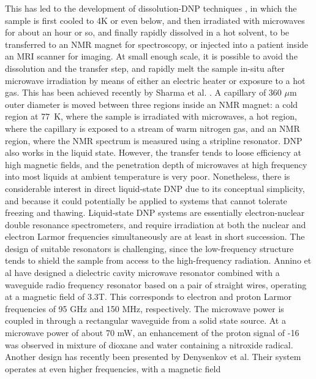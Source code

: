 This has led to the development of dissolution-DNP techniques
\cite{ArdenkjaerLarsen:2016jq}, in which the sample is first cooled to 4K
or even below, and then irradiated with microwaves for about an hour or
so, and finally rapidly dissolved in a hot solvent, to be transferred to
an NMR magnet for spectroscopy, or injected into a patient inside an MRI
scanner for imaging. At small enough scale, it is possible to avoid the
dissolution and the transfer step, and rapidly melt the sample in-situ
after microwave irradiation by means of either an electric heater or
exposure to a hot gas. This has been achieved recently by Sharma et al.
\cite{Sharma:2015ce}. A capillary of 360 $\mu$m outer diameter is moved
between three regions inside an NMR magnet: a cold region at 77~K, where
the sample is irradiated with microwaves, a hot region, where the
capillary is exposed to a stream of warm nitrogen gas, and an NMR
region, where the NMR spectrum is measured using a stripline resonator.
DNP also works in the liquid state. However, the transfer tends to loose
efficiency at high magnetic fields, and the penetration depth of
microwaves at high frequency into most liquids at ambient temperature is
very poor. Nonetheless, there is considerable interest in direct
liquid-state DNP \cite{Loening:2002wg,Lingwood:2009jy,Griffin:2010cu} due
to its conceptual simplicity, and because it could potentially be
applied to systems that cannot tolerate freezing and thawing.
Liquid-state DNP systems are essentially electron-nuclear double
resonance spectrometers, and require irradiation at both the nuclear and
electron Larmor frequencies simultaneously are at least in short
succession. The design of suitable resonators is challenging, since the
low-frequency structure tends to shield the sample from access to the
high-frequency radiation. Annino et al
\cite{Annino:2009gd,VillanuevaGaribay:2010cu,vanBentum:2011km} have
designed a dielectric cavity microwave resonator combined with a
waveguide radio frequency resonator based on a pair of straight wires,
operating at a magnetic field of 3.3T. This corresponds to electron and
proton Larmor frequencies of 95 GHz and 150 MHz, respectively. The
microwave power is coupled in through a rectangular waveguide from a
solid state source. At a microwave power of about 70 mW, an enhancement
of the proton signal of -16 was observed in mixture of dioxane and water
containing a nitroxide radical. Another design has recently been
presented by Denysenkov et al.
\cite{Denysenkov:2010hy,Denysenkov:2008gf,Denysenkov:2012jy,Prandolini:2009he}
Their system operates at even higher frequencies, with a magnetic field
